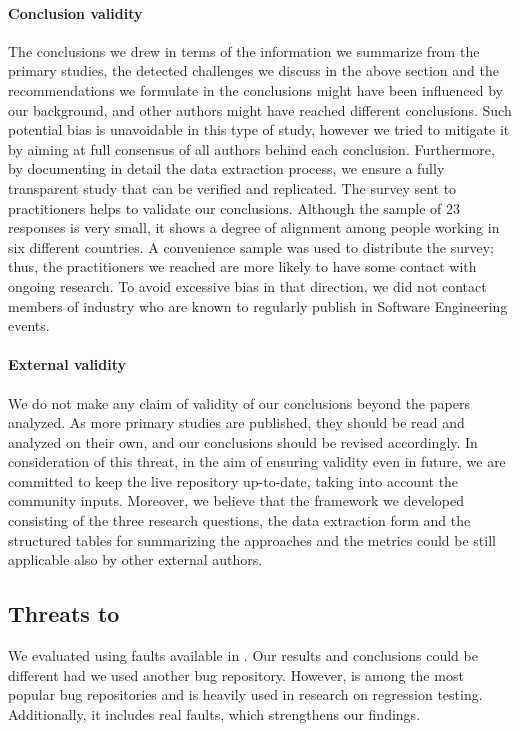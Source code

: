 \paragraph{Conclusion validity}
The conclusions we drew in terms of  the information  we summarize from the primary studies, the detected challenges we discuss in the above section and the recommendations we formulate in the conclusions might have been influenced by our background, and other authors might have reached different conclusions.
Such potential bias is unavoidable in this type of study, however we tried to mitigate it by aiming at full consensus of all authors behind each conclusion.
Furthermore, by documenting in detail the data extraction process, we ensure a fully transparent study that can be verified and replicated.
The survey sent to practitioners helps to validate our conclusions.
Although the sample of 23 responses is very small, it shows a degree of alignment among people working in six different countries.
A convenience sample was used to distribute the survey; thus, the practitioners we reached are more likely to have some contact with ongoing research.
To avoid excessive bias in that direction, we did not contact members of industry who are known to regularly publish in Software Engineering events.

\paragraph{External validity}
We do not make any claim of validity of our conclusions beyond the \numpapers papers analyzed.
As more primary studies are published, they should be read and analyzed on their own, and our conclusions should be revised accordingly. In consideration of this threat, in the aim of ensuring validity even in future, we are committed to keep the live repository up-to-date, taking into account the community inputs.
Moreover, we believe that the framework we developed consisting of the three research questions, the data extraction form and the structured tables for summarizing the approaches and the metrics could be still applicable also by other external authors.

\subsection{Threats to  }

We evaluated \fz using faults available in \dfj.  Our results and
conclusions could be different had we used another bug repository.
However, \dfj is among the most popular bug repositories and is
heavily used in research on regression testing.  Additionally, it
includes real faults, which strengthens our findings.

